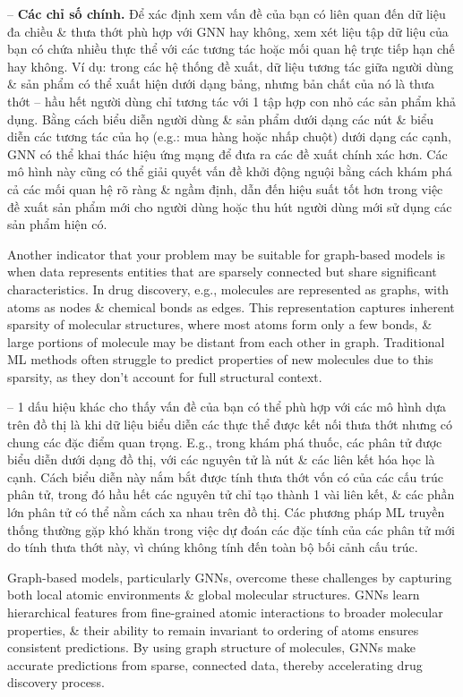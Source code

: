 \documentclass{article}
\begin{document}
\begin{itemize}
\begin{itemize}
\begin{itemize}
            -- {\bf Các chỉ số chính.} Để xác định xem vấn đề của bạn có liên quan đến dữ liệu đa chiều \& thưa thớt phù hợp với GNN hay không, xem xét liệu tập dữ liệu của bạn có chứa nhiều thực thể với các tương tác hoặc mối quan hệ trực tiếp hạn chế hay không. Ví dụ: trong các hệ thống đề xuất, dữ liệu tương tác giữa người dùng \& sản phẩm có thể xuất hiện dưới dạng bảng, nhưng bản chất của nó là thưa thớt -- hầu hết người dùng chỉ tương tác với 1 tập hợp con nhỏ các sản phẩm khả dụng. Bằng cách biểu diễn người dùng \& sản phẩm dưới dạng các nút \& biểu diễn các tương tác của họ (e.g.: mua hàng hoặc nhấp chuột) dưới dạng các cạnh, GNN có thể khai thác hiệu ứng mạng để đưa ra các đề xuất chính xác hơn. Các mô hình này cũng có thể giải quyết vấn đề khởi động nguội bằng cách khám phá cả các mối quan hệ rõ ràng \& ngầm định, dẫn đến hiệu suất tốt hơn trong việc đề xuất sản phẩm mới cho người dùng hoặc thu hút người dùng mới sử dụng các sản phẩm hiện có.

            Another indicator that your problem may be suitable for graph-based models is when data represents entities that are sparsely connected but share significant characteristics. In drug discovery, e.g., molecules are represented as graphs, with atoms as nodes \& chemical bonds as edges. This representation captures inherent sparsity of molecular structures, where most atoms form only a few bonds, \& large portions of molecule may be distant from each other in graph. Traditional ML methods often struggle to predict properties of new molecules due to this sparsity, as they don't account for full structural context.

            -- 1 dấu hiệu khác cho thấy vấn đề của bạn có thể phù hợp với các mô hình dựa trên đồ thị là khi dữ liệu biểu diễn các thực thể được kết nối thưa thớt nhưng có chung các đặc điểm quan trọng. E.g., trong khám phá thuốc, các phân tử được biểu diễn dưới dạng đồ thị, với các nguyên tử là nút \& các liên kết hóa học là cạnh. Cách biểu diễn này nắm bắt được tính thưa thớt vốn có của các cấu trúc phân tử, trong đó hầu hết các nguyên tử chỉ tạo thành 1 vài liên kết, \& các phần lớn phân tử có thể nằm cách xa nhau trên đồ thị. Các phương pháp ML truyền thống thường gặp khó khăn trong việc dự đoán các đặc tính của các phân tử mới do tính thưa thớt này, vì chúng không tính đến toàn bộ bối cảnh cấu trúc.

            Graph-based models, particularly GNNs, overcome these challenges by capturing both local atomic environments \& global molecular structures. GNNs learn hierarchical features from fine-grained atomic interactions to broader molecular properties, \& their ability to remain invariant to ordering of atoms ensures consistent predictions. By using graph structure of molecules, GNNs make accurate predictions from sparse, connected data, thereby accelerating drug discovery process.


\end{itemize}
\end{itemize}
\end{itemize}
\end{document}
